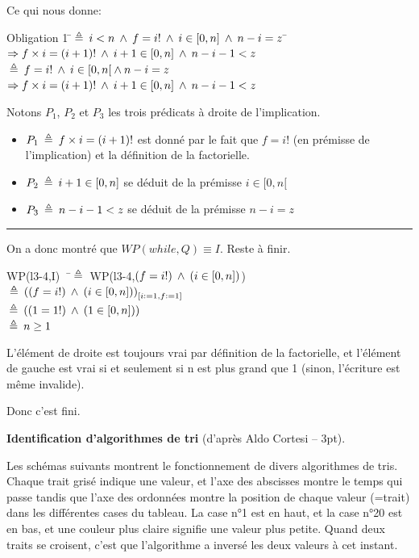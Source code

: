 \documentclass[10pt]{article}\usepackage[nu]{esial}
\begin{document}
\begin{Reponse}
  Ce qui nous donne:
  \begin{tabbing}
  Obligation 1 \=$\:\triangleq\: i<n \:\wedge\: f=i! \:\wedge\: i\in[0,n] \:\wedge\: n-i=z$
  \=$\Rightarrow f\times i=(i+1)! \:\wedge\: i+1\in[0,n] \:\wedge\: n-i-1<z$\\
  \>$\:\triangleq\: f=i! \:\wedge\: i\in[0,n[ \:\wedge\: n-i=z$
  \>$\Rightarrow  f\times i=(i+1)! \:\wedge\:  i+1\in[0,n] \:\wedge\: n-i-1<z$  
  \end{tabbing}
  Notons $P_1$, $P_2$ et $P_3$ les trois prédicats à droite de
  l'implication.
  \begin{itemize}
  \item $P_1\:\triangleq\: f\times i=(i+1)!$ est donné par le fait que $f=i!$ (en prémisse
    de l'implication) et la définition de la factorielle.
  \item $P_2\:\triangleq\: i+1\in[0,n]$ se déduit de la prémisse $i\in[0,n[$
  \item $P_3\:\triangleq\: n-i-1<z$ se déduit de la prémisse $n-i=z$
  \end{itemize}

  \hrule

  On a donc montré que $WP(while,Q)\equiv I$. Reste à finir.

  \noindent
  \begin{tabbing}
  WP(l3-4,I)~~\=$\:\triangleq\:$ WP(l3-4,$(f=i!)\:\wedge\: (i\in[0,n])$)\\    
  \>$\:\triangleq\:\left((f=i!)\:\wedge\: (i\in[0,n])\right)_{[i:=1,f:=1]}$\\    
  \>$\:\triangleq\:\left((1=1!)\:\wedge\: (1\in[0,n])\right)$    \\
  \>$\:\triangleq\: n\geq 1$  
  \end{tabbing}
  L'élément de droite est toujours vrai par définition de la factorielle, et
  l'élément de gauche est vrai si et seulement si n est plus grand que 1
  (sinon, l'écriture est même invalide).

  Donc c'est fini. 
\end{Reponse}
\newpage
\Exercice\textbf{Identification d'algorithmes de tri} (d'après Aldo Cortesi --
3pt).

Les schémas suivants montrent le fonctionnement de divers algorithmes de
tris. Chaque trait grisé indique une valeur, et l'axe des abscisses montre le
temps qui passe tandis que l'axe des ordonnées montre la position de chaque
valeur (=trait) dans les différentes cases du tableau. La case n°1 est en haut,
et la case n°20 est en bas, et une couleur plus claire signifie une valeur plus
petite. Quand deux traits se croisent, c'est que l'algorithme a inversé les
deux valeurs à cet instant.
\end{document}

